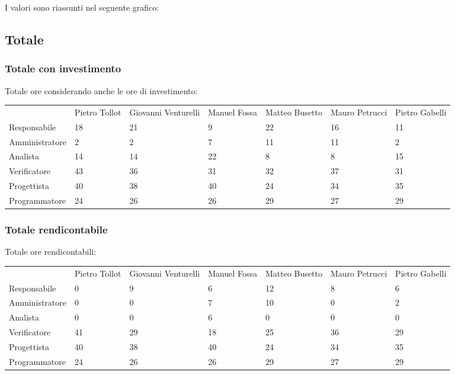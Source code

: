 I valori sono riassunti nel seguente grafico:


\subsection{Totale}
\subsubsection{Totale con investimento}
Totale ore considerando anche le ore di investimento:

\begin{table}[h] %
\begin{tabular}{lllllll}
 & Pietro Tollot & Giovanni Venturelli & Manuel Fossa & Matteo Busetto & Mauro Petrucci & Pietro Gabelli \\
Responsabile & 18 & 21 & 9 & 22 & 16 & 11 \\
Amministratore & 2 & 2 & 7 & 11 & 11 & 2 \\
Analista & 14 & 14 & 22 & 8 & 8 & 15 \\
Verificatore & 43 & 36 & 31 & 32 & 37 & 31 \\
Progettista & 40 & 38 & 40 & 24 & 34 & 35 \\
Programmatore & 24 & 26 & 26 & 29 & 27 & 29 
\end{tabular}
\end{table}


\subsubsection{Totale rendicontabile}
Totale ore rendicontabili:

\begin{table}[h] %
\begin{tabular}{lllllll}
 & Pietro Tollot & Giovanni Venturelli & Manuel Fossa & Matteo Busetto & Mauro Petrucci & Pietro Gabelli \\
Responsabile & 0 & 9 & 6 & 12 & 8 & 6 \\
Amministratore & 0 & 0 & 7 & 10 & 0 & 2 \\
Analista & 0 & 0 & 6 & 0 & 0 & 0 \\
Verificatore & 41 & 29 & 18 & 25 & 36 & 29 \\
Progettista & 40 & 38 & 40 & 24 & 34 & 35 \\
Programmatore & 24 & 26 & 26 & 29 & 27 & 29 
\end{tabular}
\end{table}


